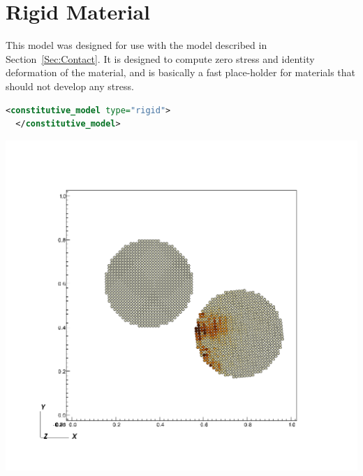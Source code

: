 \section{Rigid Material}  This model was designed for use with the
 model described in Section~\ref{Sec:Contact}.
It is designed to compute zero stress and identity deformation of the material,
and is basically a fast place-holder for materials that should not develop
any stress.

\begin{lstlisting}[language=XML]
  <constitutive_model type="rigid">
  </constitutive_model>
\end{lstlisting}

\begin{minipage}[t]{0.9\textwidth}
  \centering
  \includegraphics[width=0.5\columnwidth]{FIGS/contact/specified2.png}
\end{minipage}

